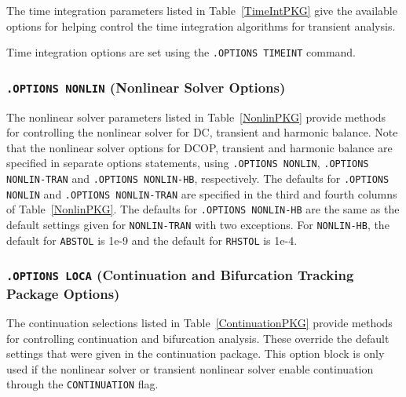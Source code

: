 The time integration parameters listed in Table~\ref{TimeIntPKG} give the
available options for helping control the time integration algorithms for
transient analysis.

Time integration options are set using the \texttt{.OPTIONS TIMEINT} command.




\subsubsection{\texttt{.OPTIONS NONLIN} (Nonlinear Solver Options)}

The nonlinear solver parameters listed in Table~\ref{NonlinPKG} provide
methods for controlling the nonlinear solver for 
 DC, 
 transient and harmonic balance. Note that the
nonlinear solver options for DCOP, transient and harmonic balance are
specified in separate options statements, using \texttt{.OPTIONS
 NONLIN}, \texttt{.OPTIONS NONLIN-TRAN} and \texttt{.OPTIONS
 NONLIN-HB}, respectively. The defaults for  \texttt{.OPTIONS
 NONLIN} and \texttt{.OPTIONS NONLIN-TRAN} are specified in the
third and fourth columns of Table~\ref{NonlinPKG}.  The defaults for 
\texttt{.OPTIONS NONLIN-HB} are the same as the default settings given for
\texttt{NONLIN-TRAN} with two exceptions. For \texttt{NONLIN-HB}, the default
for \texttt{ABSTOL} is 1e-9 and the default for \texttt{RHSTOL} is 1e-4.




\subsubsection{\texttt{.OPTIONS LOCA} (Continuation and Bifurcation Tracking Package Options)}

The continuation selections listed in Table~\ref{ContinuationPKG}
provide methods for controlling continuation and bifurcation analysis.
These override the default settings that were given in the
continuation package.  This option block is only used if the nonlinear
solver or transient nonlinear solver enable continuation through the
\texttt{CONTINUATION} flag.

